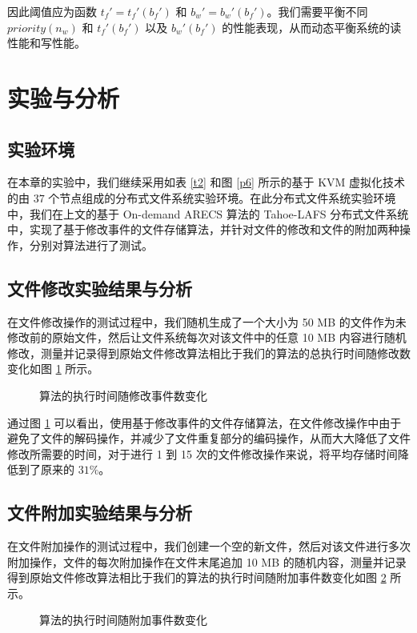 因此阈值应为函数 $t_{f}'=t_{f}'(b_{f}')$ 和 $b_{w}'=b_{w}'(b_{f}')$。我们需要平衡不同 $priority(n_{w})$ 和 $t_{f}'(b_{f}')$ 以及 $b_{w}'(b_{f}')$ 的性能表现，从而动态平衡系统的读性能和写性能。
\section{实验与分析}
\subsection{实验环境}
在本章的实验中，我们继续采用如表 \ref{t2} 和图 \ref{p6} 所示的基于 KVM 虚拟化技术的由 $37$ 个节点组成的分布式文件系统实验环境。在此分布式文件系统实验环境中，我们在上文的基于 On-demand ARECS 算法的 Tahoe-LAFS 分布式文件系统中，实现了基于修改事件的文件存储算法，并针对文件的修改和文件的附加两种操作，分别对算法进行了测试。
\subsection{文件修改实验结果与分析}
在文件修改操作的测试过程中，我们随机生成了一个大小为 50 MB 的文件作为未修改前的原始文件，然后让文件系统每次对该文件中的任意 10 MB 内容进行随机修改，测量并记录得到原始文件修改算法相比于我们的算法的总执行时间随修改数变化如图 \ref{p18} 所示。

\begin{figure}[!htb]
\centering
\resizebox{.8\textwidth}{!}{}
\caption{算法的执行时间随修改事件数变化}
\label{p18}
\end{figure}

通过图 \ref{p18} 可以看出，使用基于修改事件的文件存储算法，在文件修改操作中由于避免了文件的解码操作，并减少了文件重复部分的编码操作，从而大大降低了文件修改所需要的时间，对于进行 1 到 15 次的文件修改操作来说，将平均存储时间降低到了原来的 $31\%$。
\subsection{文件附加实验结果与分析}
在文件附加操作的测试过程中，我们创建一个空的新文件，然后对该文件进行多次附加操作，文件的每次附加操作在文件末尾追加 10 MB 的随机内容，测量并记录得到原始文件修改算法相比于我们的算法的执行时间随附加事件数变化如图 \ref{p17} 所示。

\begin{figure}[!htb]
\centering
\resizebox{.8\textwidth}{!}{}
\caption{算法的执行时间随附加事件数变化}
\label{p17}
\end{figure}

